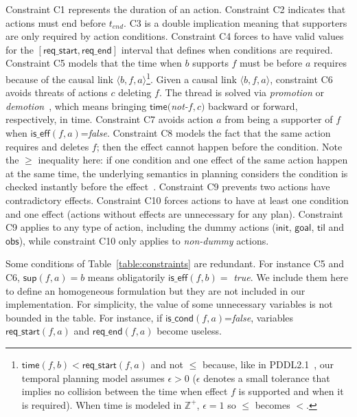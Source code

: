 \documentclass{ecai}
\newcommand{\tup}[1]{{\langle #1 \rangle}}
\newcommand{\iscond}{\mathsf{is\_cond}}    %
\newcommand{\iseff}{\mathsf{is\_eff}}    %
\newcommand{\obs}{\mathsf{obs}}    %
\newcommand{\til}{\mathsf{til}}    %
\newcommand{\supp}{\mathsf{sup}}   %
\newcommand{\tim}{\mathsf{time}}   %
\newcommand{\reqs}{\mathsf{req\_{start}}} %
\newcommand{\reqe}{\mathsf{req\_{end}}}   %
\newcommand{\ini}{\mathsf{init}}   %
\newcommand{\goal}{\mathsf{goal}}  %
\begin{document}
Constraint C1 represents the duration of an action. Constraint C2 indicates that actions must end before $t_{end}$. C3 is a double implication meaning that supporters are only required by action conditions. Constraint C4 forces to have valid values for the $[\reqs,\reqe]$ interval that defines when conditions are required. Constraint C5 models that the time when $b$ supports $f$ must be before $a$ requires because of the causal link $\tup{b,f,a}$\footnote{$\tim(f,b) < \reqs(f,a)$ and not $\leq$ because, like in PDDL2.1~\cite{fox2003pddl2}, our temporal planning model assumes $\epsilon > 0$ ($\epsilon$ denotes a small tolerance that implies no collision between the time when effect $f$ is supported and when it is required). When time is modeled in $\mathbb{Z}^+$, $\epsilon=1$ so $\leq$ becomes $<$.}. Given a causal link $\tup{b,f,a}$, constraint C6 avoids threats of actions $c$ deleting $f$. The thread is solved via {\em promotion} or {\em demotion}~\cite{ghallab2004automated}, which means bringing $\tim($\textit{not-}$f,c)$ backward or forward, respectively, in time. Constraint C7 avoids action $a$ from being a supporter of $f$ when $\iseff(f,a)$=\textit{false}. Constraint C8 models the fact that the same action requires and deletes $f$; then the effect cannot happen before the condition. Note the $\geq$ inequality here: if one condition and one effect of the same action happen at the same time, the underlying semantics in planning considers the condition is checked instantly before the effect~\cite{fox2003pddl2}. Constraint C9 prevents two actions have contradictory effects. Constraint C10 forces actions to have at least one condition and one effect (actions without effects are unnecessary for any plan). Constraint C9 applies to any type of action, including the dummy actions ($\ini$, $\goal$, $\til$ and $\obs$), while constraint C10 only applies to {\em non-dummy} actions. 

Some conditions of Table~\ref{table:constraints} are redundant. For instance C5 and C6, $\supp(f,a)=b$ means obligatorily $\iseff(f,b)=$ \textit{true}. We include them here to define an homogeneous formulation but they are not included in our implementation. For simplicity, the value of some unnecessary variables is not bounded in the table. For instance, if $\iscond(f,a)$=\textit{false}, variables $\reqs(f,a)$ and $\reqe(f,a)$ become useless.
\end{document}
